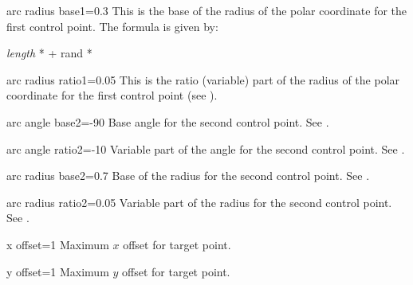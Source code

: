 \documentclass[a4paper]{article}
\begin{document}
\begin{docKey}{arc radius base1}{=}{0.3}
  This is the base of the radius of the polar coordinate for the first
  control point. The formula is given by:

  \textit{length} *
   + rand * 

\end{docKey}

\begin{docKey}{arc radius ratio1}{=}{0.05}
  This is the ratio (variable) part of the radius of the polar coordinate for
  the first control point (see ).
\end{docKey}


\begin{docKey}{arc angle base2}{=}{-90}
  Base angle for the second control point. See .
\end{docKey}

\begin{docKey}{arc angle ratio2}{=}{-10}
  Variable part of the angle for the second control point. See .
\end{docKey}

\begin{docKey}{arc radius base2}{=}{0.7}
    Base of the radius for the second control point. See .
\end{docKey}

\begin{docKey}{arc radius ratio2}{=}{0.05}
    Variable part of the radius for the second control point. See
    .
\end{docKey}


\begin{docKey}{x offset}{=}{1}
  Maximum $x$ offset for target point.
\end{docKey}

\begin{docKey}{y offset}{=}{1}
  Maximum $y$ offset for target point.
\end{docKey}






\end{document}
